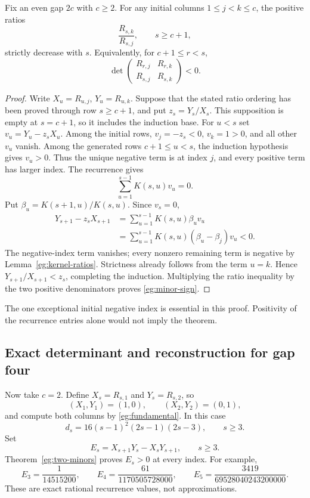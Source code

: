 \begin{theorem}
\label{eg:two-minors}
Fix an even gap $2c$ with $c\ge2$. For any initial columns
$1\le j<k\le c$, the positive ratios
\[
                   \frac{R_{s,k}}{R_{s,j}},\qquad s\ge c+1,
\]
strictly decrease with $s$. Equivalently, for $c+1\le r<s$,
\begin{equation}\label{eg:minor-sign}
 \det\begin{pmatrix}R_{r,j}&R_{r,k}\\R_{s,j}&R_{s,k}\end{pmatrix}<0.
\end{equation}
\end{theorem}

\begin{proof}
Write $X_u=R_{u,j}$, $Y_u=R_{u,k}$. Suppose that the stated ratio
ordering has been proved through row $s\ge c+1$, and put
$z_s=Y_s/X_s$. This supposition is empty at $s=c+1$, so it includes
the induction base. For $u<s$ set $v_u=Y_u-z_sX_u$. Among the initial
rows, $v_j=-z_s<0$, $v_k=1>0$, and all other $v_u$ vanish. Among
the generated rows $c+1\le u<s$, the induction hypothesis gives
$v_u>0$. Thus the unique negative term is at index $j$, and every
positive term has larger index. The recurrence gives
\[
                     \sum_{u=1}^{s-1}K(s,u)v_u=0.
\]
Put $\beta_u=K(s+1,u)/K(s,u)$. Since $v_s=0$,
\begin{align*}
 Y_{s+1}-z_sX_{s+1}
 &=\sum_{u=1}^{s-1}K(s,u)\beta_uv_u\\
 &=\sum_{u=1}^{s-1}K(s,u)(\beta_u-\beta_j)v_u<0.
\end{align*}
The negative-index term vanishes; every nonzero remaining term is
negative by Lemma~\ref{eg:kernel-ratios}. Strictness already follows
from the term $u=k$. Hence $Y_{s+1}/X_{s+1}<z_s$, completing the
induction. Multiplying the ratio inequality by the two positive
denominators proves \eqref{eg:minor-sign}.
\end{proof}

The one exceptional initial negative index is essential in this proof.
Positivity of the recurrence entries alone would not imply the theorem.

\subsection{Exact determinant and reconstruction for gap four}

Now take $c=2$. Define $X_s=R_{s,1}$ and $Y_s=R_{s,2}$, so
\[
 (X_1,Y_1)=(1,0),\qquad (X_2,Y_2)=(0,1),
\]
and compute both columns by \eqref{eg:fundamental}. In this case
\begin{equation}\label{eg:d-gapfour}
 d_s=16(s-1)^2(2s-1)(2s-3),\qquad s\ge3.
\end{equation}
Set
\begin{equation}\label{eg:casoratian}
 E_s=X_{s+1}Y_s-X_sY_{s+1},\qquad s\ge3.
\end{equation}
Theorem~\ref{eg:two-minors} proves $E_s>0$ at every index. For example,
\[
 E_3=\frac1{14515200},\qquad
 E_4=\frac{61}{1170505728000},\qquad
 E_5=\frac{3419}{69528040243200000}.
\]
These are exact rational recurrence values, not approximations.

